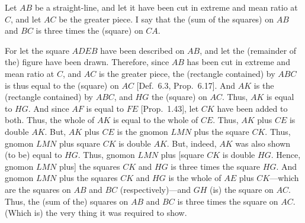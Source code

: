 \begin{Parallel}{}{}
{Let $AB$ be a straight-line, and let it have been cut in extreme and mean
ratio at $C$, and let $AC$ be the greater piece. I say that the (sum of the
squares) on $AB$ and $BC$ is three times the (square) on $CA$.

For let the square $ADEB$ have been described on $AB$, and
let the (remainder of the) figure have been drawn. Therefore, since
$AB$ has been cut in extreme and mean ratio at $C$,  and $AC$ is the greater piece, the (rectangle contained) by $ABC$ is thus equal to the
(square) on $AC$ [Def.~6.3, Prop.~6.17]. And $AK$ is the (rectangle
contained) by $ABC$, and $HG$ the (square) on $AC$. Thus,
$AK$ is equal to $HG$.  And since $AF$ is equal to $FE$ [Prop.~1.43],
let $CK$ have been added to both. Thus, the whole of $AK$  is equal to
the whole of $CE$. Thus, $AK$ plus $CE$ is double $AK$. But, $AK$
plus $CE$ is the gnomon $LMN$ plus the square $CK$. Thus, 
gnomon $LMN$ plus square $CK$ is double $AK$. But, indeed,
$AK$ was also shown (to be) equal to $HG$. Thus, gnomon $LMN$
plus [square $CK$ is double $HG$. Hence, gnomon $LMN$ plus] the
 squares $CK$ and $HG$ is three times the square $HG$.
And  gnomon $LMN$ plus the  squares  $CK$ and
$HG$ is the whole of $AE$ plus $CK$---which are the 
squares on $AB$ and $BC$ (respectively)---and $GH$ (is) the square on $AC$. 
Thus, the (sum of the) squares on $AB$ and $BC$ is three times the
square on $AC$. (Which is) the very thing it was required to show.}
\end{Parallel}

